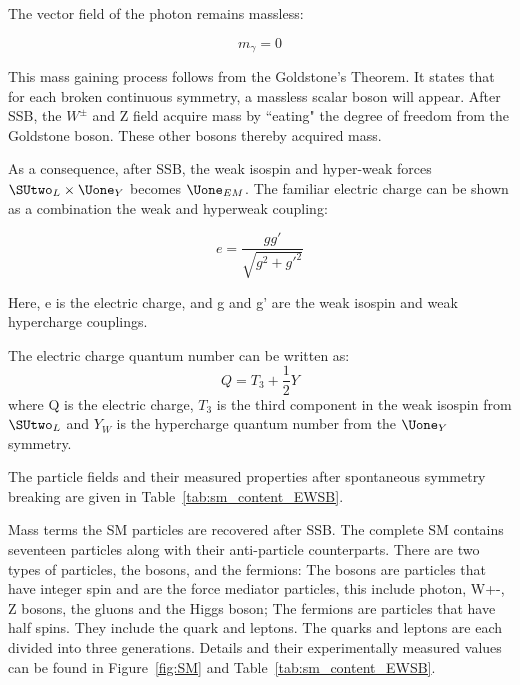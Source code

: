 The vector field of the photon remains massless:

\begin{equation}
    m_{\gamma}=0
\end{equation}

This mass gaining process follows from the Goldstone's Theorem\cite{PhysRev.117.648}. It states that for each broken continuous symmetry, a massless scalar boson will appear. After SSB, the $W^{\pm}$ and Z field acquire mass by ``eating" the degree of freedom from the Goldstone boson. These other bosons thereby acquired mass. 

As a consequence, after SSB, the weak isospin and hyper-weak forces $\SUtwo_{L} \times \Uone_{Y}$ becomes $\Uone_{EM}$. The familiar electric charge can be shown as a combination the weak and hyperweak coupling:

\begin{equation}
    e= \frac{g g'}{\sqrt{g^{2}+g'^{2}}}
\end{equation}

Here, e is the electric charge, and g and g' are the weak isospin and weak hypercharge couplings. 

The electric charge quantum number can be written as:
\begin{equation}
    Q=T_{3}+\frac{1}{2}Y
\end{equation}
where Q is the electric charge, $T_{3}$ is the third component in the weak isospin from $\SUtwo_{L}$ and $Y_{W}$ is the hypercharge quantum number from the $\Uone_{Y}$ symmetry. 

    

The particle fields and their measured properties after spontaneous symmetry breaking are given in Table~\ref{tab:sm_content_EWSB}.

Mass terms the SM particles are recovered after SSB. The complete SM contains seventeen particles along with their anti-particle counterparts. There are two types of particles, the bosons, and the fermions: The bosons are particles that have integer spin and are the force mediator particles, this include photon, W+-, Z bosons, the gluons and the Higgs boson; The fermions are particles that have half spins.
They include the quark and leptons. The quarks and leptons are each divided into three generations. Details and their experimentally measured values can be found in Figure~\ref{fig:SM} and Table~\ref{tab:sm_content_EWSB}.

